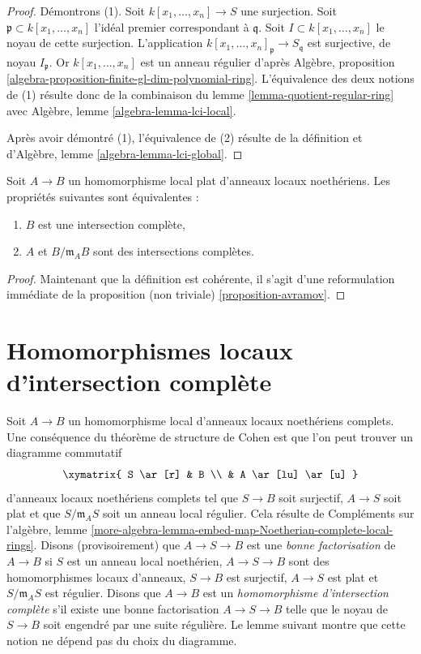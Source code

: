 \begin{proof}
Démontrons (1). Soit $k[x_1, \ldots, x_n] \to S$ une surjection.
Soit $\mathfrak p \subset k[x_1, \ldots, x_n]$ l'idéal premier
correspondant à $\mathfrak q$.
Soit $I \subset k[x_1, \ldots, x_n]$ le noyau de cette surjection.
L'application $k[x_1, \ldots, x_n]_\mathfrak p \to S_\mathfrak q$
est surjective, de noyau $I_\mathfrak p$. Or
$k[x_1, \ldots, x_n]$ est un anneau régulier d'après
Algèbre, proposition
\ref{algebra-proposition-finite-gl-dim-polynomial-ring}.
L'équivalence des deux notions de (1) résulte donc de la combinaison du
lemme \ref{lemma-quotient-regular-ring}
avec Algèbre, lemme \ref{algebra-lemma-lci-local}.

\medskip\noindent
Après avoir démontré (1), l'équivalence de (2) résulte de la
définition et d'Algèbre, lemme \ref{algebra-lemma-lci-global}.
\end{proof}

\begin{lemma}
\label{lemma-avramov}
Soit $A \to B$ un homomorphisme local plat d'anneaux locaux noethériens.
Les propriétés suivantes sont équivalentes :
\begin{enumerate}
\item $B$ est une intersection complète,
\item $A$ et $B/\mathfrak m_A B$ sont des intersections complètes.
\end{enumerate}
\end{lemma}

\begin{proof}
Maintenant que la définition est cohérente, il s'agit d'une reformulation
immédiate de la proposition (non triviale) \ref{proposition-avramov}.
\end{proof}








\section{Homomorphismes locaux d'intersection complète}
\label{section-lci-homomorphisms}

\noindent
Soit $A \to B$ un homomorphisme local d'anneaux locaux noethériens complets.
Une conséquence du théorème de structure de Cohen est que l'on peut trouver un
diagramme commutatif
$$
\xymatrix{
S \ar[r] & B \\
& A \ar[lu] \ar[u]
}
$$
d'anneaux locaux noethériens complets tel que
$S \to B$ soit surjectif, $A \to S$ soit plat et que
$S/\mathfrak m_A S$ soit un anneau local régulier. Cela résulte de
Compléments sur l'algèbre, lemme
\ref{more-algebra-lemma-embed-map-Noetherian-complete-local-rings}.
Disons (provisoirement) que $A \to S \to B$ est une {\it bonne factorisation}
de $A \to B$ si $S$ est un anneau local noethérien,
$A \to S \to B$ sont des homomorphismes locaux d'anneaux,
$S \to B$ est surjectif, $A \to S$ est plat et $S/\mathfrak m_AS$ est régulier.
Disons que $A \to B$ est un
{\it homomorphisme d'intersection complète}
s'il existe une bonne factorisation $A \to S \to B$
telle que le noyau de $S \to B$ soit engendré par une suite régulière.
Le lemme suivant montre que cette notion ne dépend pas
du choix du diagramme.

